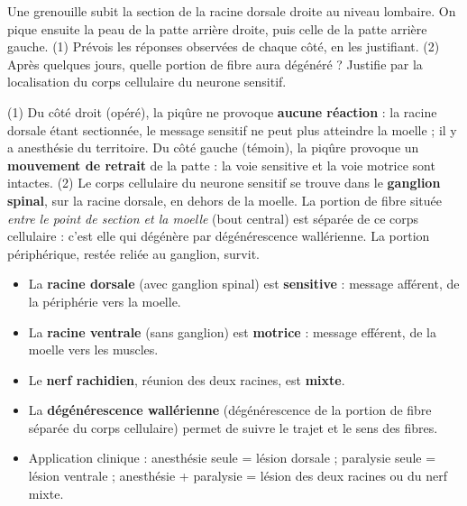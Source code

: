 \documentclass[11pt]{article}
\begin{document}
\begin{exercice}
Une grenouille subit la section de la racine dorsale droite au niveau lombaire. On pique ensuite la peau de la patte arrière droite, puis celle de la patte arrière gauche. (1) Prévois les réponses observées de chaque côté, en les justifiant. (2) Après quelques jours, quelle portion de fibre aura dégénéré ? Justifie par la localisation du corps cellulaire du neurone sensitif.
\end{exercice}

\begin{corrige}
(1) Du côté droit (opéré), la piqûre ne provoque \textbf{aucune réaction} : la racine dorsale étant sectionnée, le message sensitif ne peut plus atteindre la moelle ; il y a anesthésie du territoire. Du côté gauche (témoin), la piqûre provoque un \textbf{mouvement de retrait} de la patte : la voie sensitive et la voie motrice sont intactes. (2) Le corps cellulaire du neurone sensitif se trouve dans le \textbf{ganglion spinal}, sur la racine dorsale, en dehors de la moelle. La portion de fibre située \emph{entre le point de section et la moelle} (bout central) est séparée de ce corps cellulaire : c'est elle qui dégénère par dégénérescence wallérienne. La portion périphérique, restée reliée au ganglion, survit.
\end{corrige}

\begin{aretenir}
\begin{itemize}
\item La \textbf{racine dorsale} (avec ganglion spinal) est \textbf{sensitive} : message afférent, de la périphérie vers la moelle.
\item La \textbf{racine ventrale} (sans ganglion) est \textbf{motrice} : message efférent, de la moelle vers les muscles.
\item Le \textbf{nerf rachidien}, réunion des deux racines, est \textbf{mixte}.
\item La \textbf{dégénérescence wallérienne} (dégénérescence de la portion de fibre séparée du corps cellulaire) permet de suivre le trajet et le sens des fibres.
\item Application clinique : anesthésie seule = lésion dorsale ; paralysie seule = lésion ventrale ; anesthésie + paralysie = lésion des deux racines ou du nerf mixte.
\end{itemize}
\end{aretenir}
\end{document}
